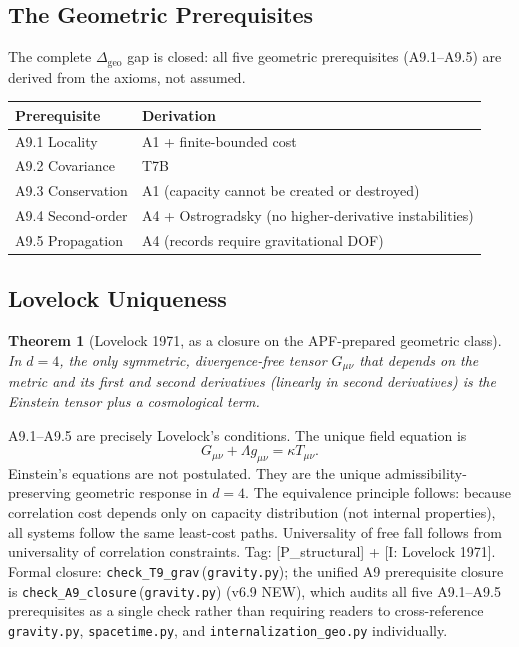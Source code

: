 \documentclass[11pt]{article}
\newtheorem{theorem}{Theorem}[section]
\newcommand{\coderef}[2]{\texttt{#1}\,(\texttt{#2})}
\begin{document}
\subsection{The Geometric Prerequisites}
The complete $\Delta_{\mathrm{geo}}$ gap is closed: all five geometric
prerequisites (A9.1--A9.5) are derived from the axioms, not assumed.

\begin{center}
\begin{tabular}{@{}ll@{}}
\toprule
Prerequisite & Derivation \\
\midrule
A9.1 Locality & A1 + finite-bounded cost \\
A9.2 Covariance & T7B \\
A9.3 Conservation & A1 (capacity cannot be created or destroyed) \\
A9.4 Second-order & A4 + Ostrogradsky (no higher-derivative instabilities) \\
A9.5 Propagation & A4 (records require gravitational DOF) \\
\bottomrule
\end{tabular}
\end{center}

\subsection{Lovelock Uniqueness}
\begin{theorem}[Lovelock 1971, as a closure on the APF-prepared geometric class]
In $d=4$, the only symmetric, divergence-free tensor $G_{\mu\nu}$ that depends
on the metric and its first and second derivatives (linearly in second
derivatives) is the Einstein tensor plus a cosmological term.
\end{theorem}

A9.1--A9.5 are precisely Lovelock's conditions. The unique field equation is
\[
G_{\mu\nu} + \Lambda g_{\mu\nu} = \kappa T_{\mu\nu}.
\]
Einstein's equations are not postulated. They are the unique
admissibility-preserving geometric response in $d=4$. The equivalence principle
follows: because correlation cost depends only on capacity distribution (not
internal properties), all systems follow the same least-cost paths. Universality
of free fall follows from universality of correlation constraints. Tag:
[P\_structural] + [I: Lovelock 1971]. Formal closure: \coderef{check\_T9\_grav}{gravity.py}; the unified A9
prerequisite closure is \coderef{check\_A9\_closure}{gravity.py} (v6.9
NEW), which audits all five A9.1--A9.5 prerequisites as a single check
rather than requiring readers to cross-reference \texttt{gravity.py},
\texttt{spacetime.py}, and \texttt{internalization\_geo.py}
individually.
\end{document}

